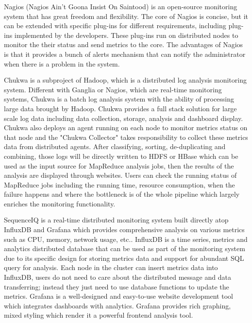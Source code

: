 Nagios (Nagios Ain’t Goona Insist On Saintood) \cite{josephsen2007building} is an open-source monitoring system that has great freedom and flexibility. 
The core of Nagios is concise, but it can be extended with specific plug-ins for different requirements, including plug-ins implemented by the developers.
These plug-ins run on distributed nodes to monitor the their status and send metrics to the core. 
The advantages of Nagios is that it provides a bunch of alerts mechanism that can notify the administrator when there is a problem in the system.
\par
Chukwa\cite{boulon2008chukwa} is a subproject of Hadoop, which is a distributed log analysis monitoring system. 
Different with Ganglia or Nagios, which are real-time monitoring systems, Chukwa is a batch log analysis system with the ability of processing large data brought by Hadoop.
Chukwa provides a full stack solution for large scale log data including data collection, storage, analysis and dashboard display.
Chukwa also deploys an agent running on each node to monitor metrics status on that node and the "Chukwa Collector" takes responsibility to collect these metrics data from distributed agents. 
After classifying, sorting, de-duplicating and combining, those logs will be directly written to HDFS or HBase which can be used as the input source for MapReduce analysis jobs, then the results of the analysis are displayed through websites.
Users can check the running status of MapReduce jobs including the running time, resource consumption, when the failure happens and where the bottleneck is of the whole pipeline which largely enriches the monitoring functionality.
\par
SequenceIQ\cite{http://sequenceiq.com} is a real-time distributed monitoring system built directly atop InfluxDB and Grafana which provides comprehensive analysis on various metrics such as CPU, memory, network usage, etc..
InfluxDB\cite{http://influxdb.com} is a time series, metrics and analytics distributed database that can be used as part of the monitoring system due to its specific design for storing metrics data and support for abundant SQL query for analysis.
Each node in the cluster can insert metrics data into InfluxDB, users do not need to care about the distributed message and data transferring; instead they just need to use database functions to update the metrics.
Grafana\cite{http://grafana.org} is a well-designed and easy-to-use website development tool which integrates dashboards with analytics. Grafana provides rich graphing, mixed styling which render it a powerful frontend analysis tool.
\par

